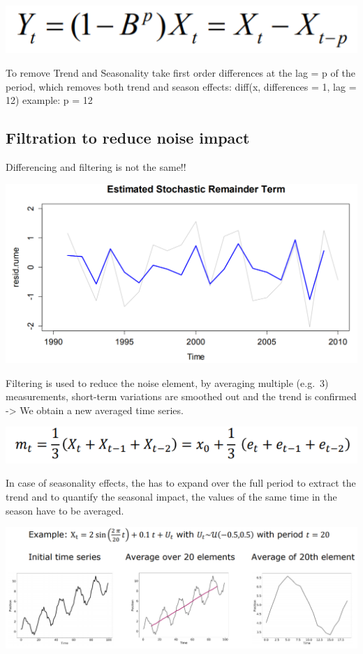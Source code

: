 \documentclass[
]{article}
\begin{document}
\includegraphics[width=0.5\linewidth]{diff_season}

To remove Trend and Seasonality take first order differences at the lag
= p of the period, which removes both trend and season effects: diff(x,
differences = 1, lag = 12) example: p = 12

\hypertarget{filtration-to-reduce-noise-impact}{%
\subsection{Filtration to reduce noise
impact}\label{filtration-to-reduce-noise-impact}}

Differencing and filtering is not the same!!

\includegraphics[width=1\linewidth]{diff_filter}

Filtering is used to reduce the noise element, by averaging multiple
(e.g.~3) measurements, short-term variations are smoothed out and the
trend is confirmed -\textgreater{} We obtain a new averaged time series.

\includegraphics[width=0.25\linewidth]{filt}

In case of seasonality effects, the has to expand over the full period
to extract the trend and to quantify the seasonal impact, the values of
the same time in the season have to be averaged.

\includegraphics[width=1\linewidth]{avg_season}
\end{document}
